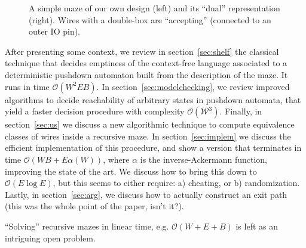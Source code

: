 \documentclass[a4paper,UKenglish,cleveref, autoref]{lipics-v2021}
\newcommand{\bigO}[1]{\ensuremath{\mathcal{O}\left( #1 \right)} }
\begin{document}
\begin{figure}[t]
  
  \caption{A simple maze of our own design (left) and its ``dual'' representation (right). Wires with a double-box are ``accepting'' (connected to an outer IO pin). \label{fig:simple}}
\end{figure}

After presenting some context, we review in section~\ref{sec:shelf} the
classical technique that decides emptiness of the context-free language
associated to a deterministic pushdown automaton built from the description of
the maze. It runs in time $\bigO{W^2EB}$. In section~\ref{sec:modelchecking}, we
review improved algorithms to decide reachability of arbitrary states in
pushdown automata, that yield a faster decision procedure with complexity
$\bigO{\mathcal{W}^3}$. Finally, in section~\ref{sec:us} we discuss a new
algorithmic technique to compute equivalence classes of wires inside a recursive
maze. In section~\ref{sec:implem} we discuss the efficient implementation of
this procedure, and show a version that terminates in time
$\bigO{WB + E \alpha(W)}$, where $\alpha$ is the inverse-Ackermann function,
improving the state of the art. We discuss how to bring this down to
$\bigO{E \log E}$, but this seems to either require: a) cheating, or b)
randomization. Lastly, in section~\ref{sec:arg}, we discuss how to actually
construct an exit path (this was the whole point of the paper, isn't it?).

``Solving'' recursive mazes in linear time, e.g. $\bigO{W + E + B}$ is left as
an intriguing open problem.
\end{document}

